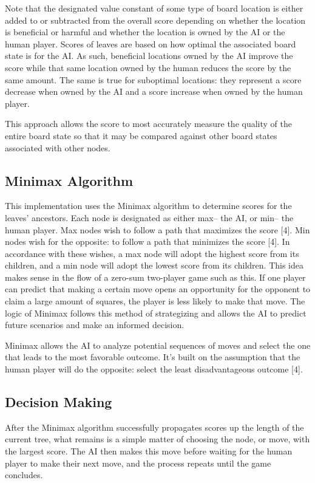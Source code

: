 \documentclass[conference]{IEEEtran}
\begin{document}
Note that the designated value constant of some type of board location is either added to or subtracted from the overall score depending on whether the location is beneficial or harmful and whether the location is owned by the AI or the human player. Scores of leaves are based on how optimal the associated board state is for the AI. As such, beneficial locations owned by the AI improve the score while that same location owned by the human reduces the score by the same amount. The same is true for suboptimal locations: they represent a score decrease when owned by the AI and a score increase when owned by the human player.

This approach allows the score to most accurately measure the quality of the entire board state so that it may be compared against other board states associated with other nodes.


\subsection{Minimax Algorithm}
This implementation uses the Minimax algorithm to determine scores for the leaves’ ancestors. Each node is designated as either max– the AI, or min– the human player. Max nodes wish to follow a path that maximizes the score [4]. Min nodes wish for the opposite: to follow a path that minimizes the score [4]. In accordance with these wishes, a max node will adopt the highest score from its children, and a min node will adopt the lowest score from its children. This idea makes sense in the flow of a zero-sum two-player game such as this. If one player can predict that making a certain move opens an opportunity for the opponent to claim a large amount of squares, the player is less likely to make that move. The logic of Minimax follows this method of strategizing and allows the AI to predict future scenarios and make an informed decision.

Minimax allows the AI to analyze potential sequences of moves and select the one that leads to the most favorable outcome. It’s built on the assumption that the human player will do the opposite: select the least disadvantageous outcome [4].


\subsection{Decision Making}
After the Minimax algorithm successfully propagates scores up the length of the current tree, what remains is a simple matter of choosing the node, or move, with the largest score. The AI then makes this move before waiting for the human player to make their next move, and the process repeats until the game concludes.
\end{document}

